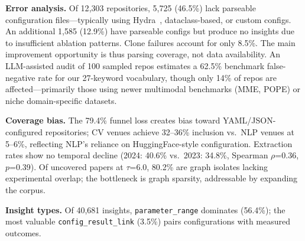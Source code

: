 \documentclass[conference]{IEEEtran}
\begin{document}
\textbf{Error analysis.}
Of 12{,}303 repositories, 5{,}725 (46.5\%) lack parseable configuration files---typically using Hydra~\cite{yadan2019hydra}, dataclass-based, or custom configs.
An additional 1{,}585 (12.9\%) have parseable configs but produce no insights due to insufficient ablation patterns.
Clone failures account for only 8.5\%.
The main improvement opportunity is thus parsing coverage, not data availability.
An LLM-assisted audit of 100 sampled repos estimates a 62.5\% benchmark false-negative rate for our 27-keyword vocabulary, though only 14\% of repos are affected---primarily those using newer multimodal benchmarks (MME, POPE) or niche domain-specific datasets.

\textbf{Coverage bias.}
The 79.4\% funnel loss creates bias toward YAML/JSON-configured repositories; CV venues achieve 32--36\% inclusion vs.\ NLP venues at 5--6\%, reflecting NLP's reliance on HuggingFace-style configuration.
Extraction rates show no temporal decline (2024: 40.6\% vs.\ 2023: 34.8\%, Spearman $\rho$=0.36, $p$=0.39).
Of uncovered papers at $\tau$=6.0, 80.2\% are graph isolates lacking experimental overlap; the bottleneck is graph sparsity, addressable by expanding the corpus.

\textbf{Insight types.}
Of 40{,}681 insights, \texttt{parameter\_range} dominates (56.4\%); the most valuable \texttt{config\_result\_link} (3.5\%) pairs configurations with measured outcomes.
\end{document}
